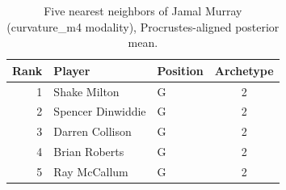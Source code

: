 \begin{table}[htbp]
  \centering\small
  \begin{tabular}{rllc}
    \toprule
    Rank & Player & Position & Archetype \\
    \midrule
    1 & Shake Milton & G & 2 \\
    2 & Spencer Dinwiddie & G & 2 \\
    3 & Darren Collison & G & 2 \\
    4 & Brian Roberts & G & 2 \\
    5 & Ray McCallum & G & 2 \\
    \bottomrule
  \end{tabular}
  \caption{Five nearest neighbors of Jamal Murray (curvature_m4 modality), Procrustes-aligned posterior mean.}
  \label{tab:Jamal_Murray_neighbors_curvature_m4}
\end{table}

